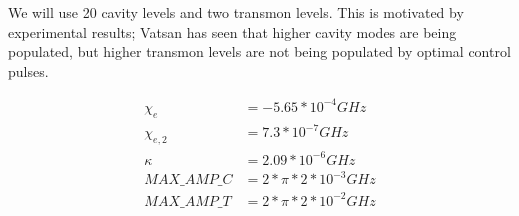 \documentclass[letterpaper, 12pt]{article}
\begin{document}
We will use 20 cavity levels and two transmon levels. This is motivated by experimental results; Vatsan has seen that higher cavity modes are being populated, but higher transmon levels are not being populated by optimal control pulses.

\begin{align*}
  \chi_{e} &= -5.65 * 10^{-4} GHz\\
  \chi_{e, 2} &= 7.3 * 10^{-7} GHz\\
  \kappa &= 2.09 * 10^{-6} GHz\\
  MAX\_AMP\_C &= 2 * \pi * 2 * 10^{-3} GHz\\
  MAX\_AMP\_T &= 2 * \pi * 2 * 10^{-2} GHz\\
\end{align*}



\end{document}
